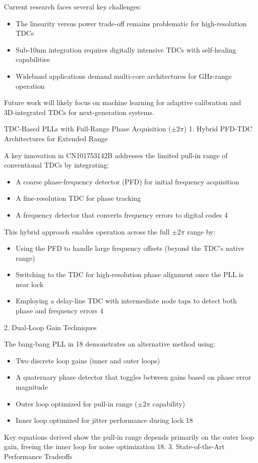 Current research faces several key challenges:
    \begin{itemize}
        \item The linearity versus power trade-off remains problematic for high-resolution TDCs
        \item Sub-10nm integration requires digitally intensive TDCs with self-healing capabilities
        \item Wideband applications demand multi-core architectures for GHz-range operation
    \end{itemize}

Future work will likely focus on machine learning for adaptive calibration and 3D-integrated TDCs for next-generation systems.

TDC-Based PLLs with Full-Range Phase Acquisition ($\pm2\pi$)
1. Hybrid PFD-TDC Architectures for Extended Range

A key innovation in CN101753142B addresses the limited pull-in range of conventional TDCs by integrating:
    \begin{itemize}
        \item A coarse phase-frequency detector (PFD) for initial frequency acquisition
        \item A fine-resolution TDC for phase tracking
        \item A frequency detector that converts frequency errors to digital codes 4
    \end{itemize}
    
This hybrid approach enables operation across the full $\pm2\pi$ range by:
    \begin{itemize}
        \item Using the PFD to handle large frequency offsets (beyond the TDC's native range)
        \item Switching to the TDC for high-resolution phase alignment once the PLL is near lock
        \item Employing a delay-line TDC with intermediate node taps to detect both phase and frequency errors 4
    \end{itemize}

2. Dual-Loop Gain Techniques

The bang-bang PLL in 18 demonstrates an alternative method using:

    \begin{itemize}
        \item Two discrete loop gains (inner and outer loops)
        \item A quaternary phase detector that toggles between gains based on phase error magnitude
        \item Outer loop optimized for pull-in range ($\pm2\pi$ capability)
        \item Inner loop optimized for jitter performance during lock 18
    \end{itemize}
Key equations derived show the pull-in range depends primarily on the outer loop gain, freeing the inner loop for noise optimization 18.
3. State-of-the-Art Performance Tradeoffs

